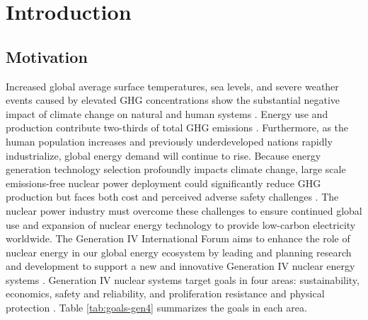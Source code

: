 \chapter{Introduction}
\label{chap:intro}


\section{Motivation}
Increased global average surface temperatures, sea levels, and severe weather 
events caused by elevated \gls{GHG} concentrations show the substantial 
negative impact of climate change on natural and human systems
\cite{noauthor_climate_2018}.
Energy use and production contribute two-thirds of total \gls{GHG}
emissions \cite{noauthor_climate_2018}.
Furthermore, as the human population increases and previously underdeveloped 
nations rapidly industrialize, global energy demand will continue to rise.  
Because energy generation technology selection profoundly impacts climate change, 
large scale emissions-free nuclear power deployment could 
significantly reduce GHG production but faces both cost and perceived adverse 
safety challenges \cite{noauthor_climate_2018, petti_future_2018}. 
The nuclear power industry must overcome these challenges to ensure continued 
global use and expansion of nuclear energy technology to provide low-carbon 
electricity worldwide.
The Generation IV International Forum aims to enhance the role of 
nuclear energy in our global energy ecosystem by leading and planning 
research and development to support a new and innovative Generation IV
nuclear energy systems \cite{gif_technology_2002}.
Generation IV nuclear systems target goals in four areas: sustainability, 
economics, safety and reliability, and proliferation resistance and physical 
protection \cite{gif_technology_2002}. 
Table \ref{tab:goals-gen4} summarizes the goals in each area. 

